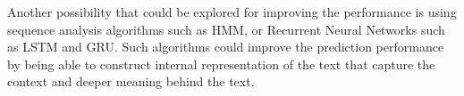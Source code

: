 Another possibility that could be explored for improving the performance is using sequence analysis algorithms such as HMM\cite{baum1966statistical}, or Recurrent Neural Networks such as LSTM\cite{hochreiter1997long} and GRU\cite{cho2014learning}. Such algorithms could improve the prediction performance by being able to construct internal representation of the text that capture the context and deeper meaning behind the text.
